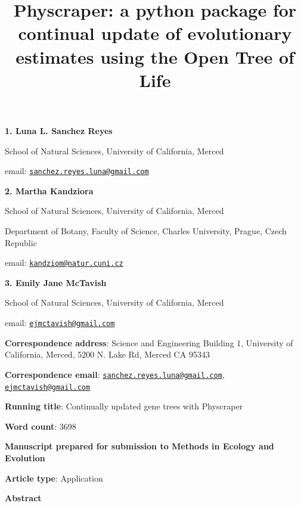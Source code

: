 \documentclass[]{article}
\title{Physcraper: a python package for continual update of evolutionary estimates using the Open Tree of Life}
\author{}
\date{\vspace{-2.5em}}
\begin{document}
\maketitle

\textbf{1. Luna L. Sanchez Reyes}

School of Natural Sciences, University of California, Merced

email: \href{mailto:sanchez.reyes.luna@gmail.com}{\nolinkurl{sanchez.reyes.luna@gmail.com}}

\textbf{2. Martha Kandziora}

School of Natural Sciences, University of California, Merced

Department of Botany, Faculty of Science, Charles University, Prague, Czech Republic

email: \href{mailto:kandziom@natur.cuni.cz}{\nolinkurl{kandziom@natur.cuni.cz}}

\textbf{3. Emily Jane McTavish}

School of Natural Sciences, University of California, Merced

email: \href{mailto:ejmctavish@gmail.com}{\nolinkurl{ejmctavish@gmail.com}}

\textbf{Correspondence address}: Science and Engineering Building 1, University of California, Merced, 5200 N. Lake Rd, Merced CA 95343

\textbf{Correspondence email}: \href{mailto:sanchez.reyes.luna@gmail.com}{\nolinkurl{sanchez.reyes.luna@gmail.com}}, \href{mailto:ejmctavish@gmail.com}{\nolinkurl{ejmctavish@gmail.com}}

\textbf{Running title}: Continually updated gene trees with Physcraper

\textbf{Word count}: 3698

\textbf{Manuscript prepared for submission to Methods in Ecology and Evolution}

\textbf{Article type}: Application

\newpage

\begingroup\Large

\textbf{Abstract}
\endgroup
\end{document}
